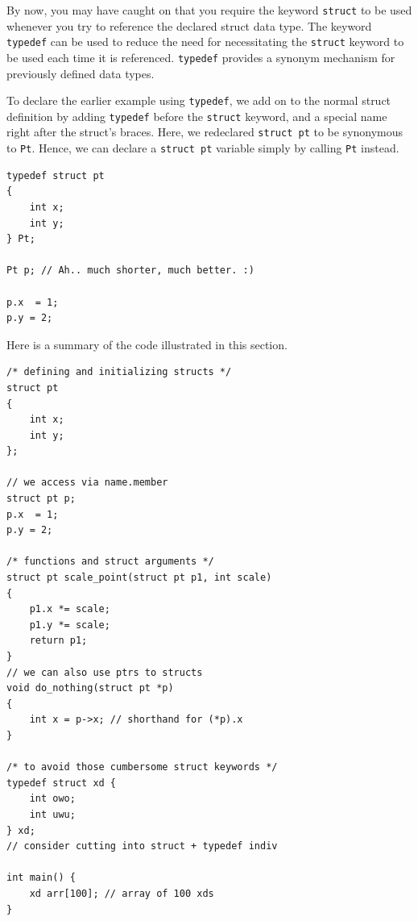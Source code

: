 By now, you may have caught on that you require the keyword \verb|struct| to be used whenever you try to reference the declared struct data type.
The keyword \verb|typedef| can be used to reduce the need for necessitating the \verb|struct| keyword to be used each time it is referenced.
\verb|typedef| provides a synonym mechanism for previously defined data types.

To declare the earlier example using \verb|typedef|, we add on to the normal struct definition by adding \verb|typedef| before the \verb|struct| keyword, and a special name right after the struct's braces.
Here, we redeclared \verb|struct pt| to be synonymous to \verb|Pt|.
Hence, we can declare a \verb|struct pt| variable simply by calling \verb|Pt| instead.

\begin{verbatim}
typedef struct pt
{
    int x;
    int y;
} Pt;

Pt p; // Ah.. much shorter, much better. :)

p.x  = 1;
p.y = 2;
\end{verbatim}

Here is a summary of the code illustrated in this section.

\begin{verbatim}
/* defining and initializing structs */
struct pt
{
    int x;
    int y;
};

// we access via name.member
struct pt p;
p.x  = 1;
p.y = 2;

/* functions and struct arguments */
struct pt scale_point(struct pt p1, int scale)
{
    p1.x *= scale;
    p1.y *= scale;
    return p1;
}
// we can also use ptrs to structs
void do_nothing(struct pt *p)
{
    int x = p->x; // shorthand for (*p).x
}

/* to avoid those cumbersome struct keywords */
typedef struct xd {
    int owo;
    int uwu;
} xd;
// consider cutting into struct + typedef indiv

int main() {
    xd arr[100]; // array of 100 xds
}
\end{verbatim}